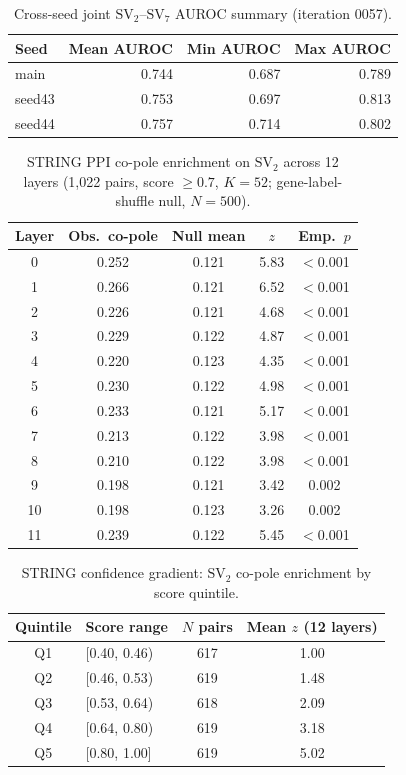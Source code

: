 \documentclass[10pt,twocolumn]{article}
\newcommand{\SV}[1]{\mathrm{SV}_{#1}}
\begin{document}
\begin{table}[H]
\centering
\caption{Cross-seed joint $\SV{2}$--$\SV{7}$ AUROC summary (iteration 0057).}
\label{tab:cross_seed}
\begin{tabular}{lrrr}
\toprule
Seed & Mean AUROC & Min AUROC & Max AUROC \\
\midrule
main & 0.744 & 0.687 & 0.789 \\
seed43 & 0.753 & 0.697 & 0.813 \\
seed44 & 0.757 & 0.714 & 0.802 \\
\bottomrule
\end{tabular}
\end{table}

\begin{table}[H]
\centering
\caption{STRING PPI co-pole enrichment on $\SV{2}$ across 12 layers (1{,}022 pairs, score $\geq 0.7$, $K = 52$; gene-label-shuffle null, $N = 500$).}
\label{tab:ppi_all_layers}
\begin{tabular}{ccccc}
\toprule
Layer & Obs.\ co-pole & Null mean & $z$ & Emp.\ $p$ \\
\midrule
0  & 0.252 & 0.121 & 5.83 & $<$0.001 \\
1  & 0.266 & 0.121 & 6.52 & $<$0.001 \\
2  & 0.226 & 0.121 & 4.68 & $<$0.001 \\
3  & 0.229 & 0.122 & 4.87 & $<$0.001 \\
4  & 0.220 & 0.123 & 4.35 & $<$0.001 \\
5  & 0.230 & 0.122 & 4.98 & $<$0.001 \\
6  & 0.233 & 0.121 & 5.17 & $<$0.001 \\
7  & 0.213 & 0.122 & 3.98 & $<$0.001 \\
8  & 0.210 & 0.122 & 3.98 & $<$0.001 \\
9  & 0.198 & 0.121 & 3.42 & 0.002 \\
10 & 0.198 & 0.123 & 3.26 & 0.002 \\
11 & 0.239 & 0.122 & 5.45 & $<$0.001 \\
\bottomrule
\end{tabular}
\end{table}

\begin{table}[H]
\centering
\caption{STRING confidence gradient: $\SV{2}$ co-pole enrichment by score quintile.}
\label{tab:confidence_gradient}
\begin{tabular}{clcc}
\toprule
Quintile & Score range & $N$ pairs & Mean $z$ (12 layers) \\
\midrule
Q1 & [0.40, 0.46) & 617 & 1.00 \\
Q2 & [0.46, 0.53) & 619 & 1.48 \\
Q3 & [0.53, 0.64) & 618 & 2.09 \\
Q4 & [0.64, 0.80) & 619 & 3.18 \\
Q5 & [0.80, 1.00] & 619 & 5.02 \\
\bottomrule
\end{tabular}
\end{table}
\end{document}
